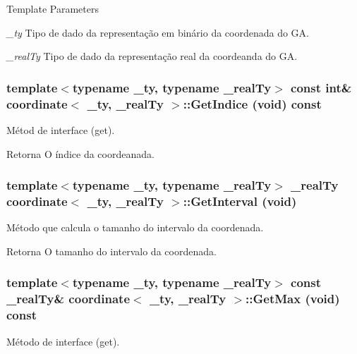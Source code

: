 \begin{DoxyTemplParams}{Template Parameters}
\item[{\em \_\-ty}]Tipo de dado da representação em binário da coordenada do GA. \item[{\em \_\-realTy}]Tipo de dado da representação real da coordeanda do GA. \end{DoxyTemplParams}
\hypertarget{classcoordinate_a617500d91429987c40541973ae80662a}{
\subsubsection[{GetIndice}]{\setlength{\rightskip}{0pt plus 5cm}template$<$typename \_\-ty, typename \_\-realTy$>$ const int\& {\bf coordinate}$<$ \_\-ty, \_\-realTy $>$::GetIndice (void) const}}
\label{classcoordinate_a617500d91429987c40541973ae80662a}
Métod de interface (get).

\begin{DoxyReturn}{Retorna}
O índice da coordeanada. 
\end{DoxyReturn}
\hypertarget{classcoordinate_aef173b7a32cc1cdb83c35f71a15f2f59}{
\subsubsection[{GetInterval}]{\setlength{\rightskip}{0pt plus 5cm}template$<$typename \_\-ty, typename \_\-realTy$>$ \_\-realTy {\bf coordinate}$<$ \_\-ty, \_\-realTy $>$::GetInterval (void)}}
\label{classcoordinate_aef173b7a32cc1cdb83c35f71a15f2f59}
Método que calcula o tamanho do intervalo da coordenada.

\begin{DoxyReturn}{Retorna}
O tamanho do intervalo da coordenada. 
\end{DoxyReturn}
\hypertarget{classcoordinate_af879abf859d6f890045dc6ad558ada96}{
\subsubsection[{GetMax}]{\setlength{\rightskip}{0pt plus 5cm}template$<$typename \_\-ty, typename \_\-realTy$>$ const \_\-realTy\& {\bf coordinate}$<$ \_\-ty, \_\-realTy $>$::GetMax (void) const}}
\label{classcoordinate_af879abf859d6f890045dc6ad558ada96}
Método de interface (get).

